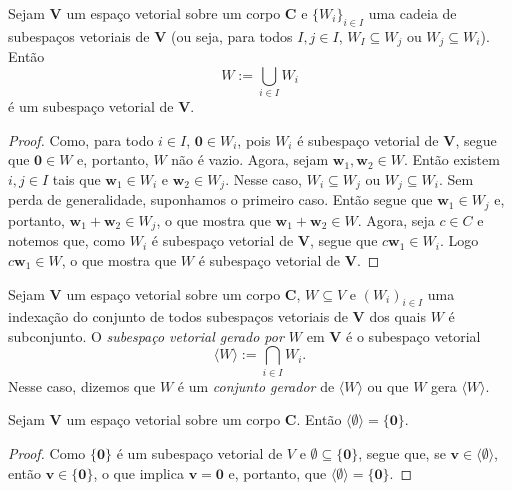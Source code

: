 \begin{proposition}
	Sejam $\bm V$ um espaço vetorial sobre um corpo $\bm C$ e $\{W_i\}_{i \in I}$ uma cadeia de subespaços vetoriais de $\bm V$ (ou seja, para todos $I,j \in I$, $W_I \subseteq W_j$ ou $W_j \subseteq W_i$). Então
	\begin{equation*}
	W := \bigcup_{i \in I} W_i
	\end{equation*}
é um subespaço vetorial de $\bm V$.
\end{proposition}
\begin{proof}
	Como, para todo $i \in I$, $\bm 0 \in W_i$, pois $W_i$ é subespaço vetorial de $\bm V$, segue que $\bm 0 \in W$ e, portanto, $W$ não é vazio. Agora, sejam $\bm w_1,\bm w_2 \in W$. Então existem $i,j \in I$ tais que $\bm w_1 \in W_i$ e $\bm w_2 \in W_j$. Nesse caso, $W_i \subseteq W_j$ ou $W_j \subseteq W_i$. Sem perda de generalidade, suponhamos o primeiro caso. Então segue que $\bm w_1 \in W_j$ e, portanto, $\bm w_1+\bm w_2 \in W_j$, o que mostra que $\bm w_1+\bm w_2 \in W$. Agora, seja $c \in C$ e notemos que, como $W_i$ é subespaço vetorial de $\bm V$, segue que $c\bm w_1 \in W_i$. Logo $c\bm w_1 \in W$, o que mostra que $W$ é subespaço vetorial de $\bm V$.
\end{proof}

\begin{definition}
	Sejam $\bm V$ um espaço vetorial sobre um corpo $\bm C$, $W \subseteq V$ e $(W_i)_{i \in I}$ uma indexação do conjunto de todos subespaços vetoriais de $\bm V$ dos quais $W$ é subconjunto. O \emph{subespaço vetorial gerado por $W$} em $\bm V$ é o subespaço vetorial
	\begin{equation*}
	\langle W \rangle := \bigcap_{i \in I} W_i.
	\end{equation*}
Nesse caso, dizemos que $W$ é um \emph{conjunto gerador} de $\langle W \rangle$ ou que $W$ gera $\langle W \rangle$.


\end{definition}

\begin{proposition}
	Sejam $\bm V$ um espaço vetorial sobre um corpo $\bm C$. Então $\langle \emptyset \rangle = \{\bm 0\}$.
\end{proposition}
\begin{proof}
	Como $\{\bm  0\}$ é um subespaço vetorial de $V$ e $\emptyset \subseteq \{\bm 0\}$, segue que, se $\bm v \in \langle \emptyset \rangle$, então $\bm v \in \{\bm 0\}$, o que implica $\bm v = \bm 0$ e, portanto, que $\langle \emptyset \rangle = \{\bm 0\}$.
\end{proof}

